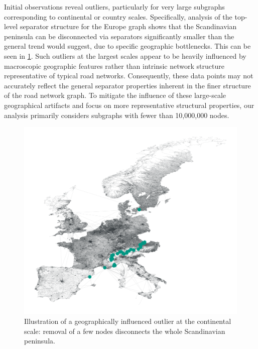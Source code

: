 Initial observations reveal outliers, particularly for very large subgraphs corresponding to continental or country scales.
Specifically, analysis of the top-level separator structure for the Europe graph shows that the Scandinavian peninsula can be disconnected via separators significantly smaller than the general trend would suggest, due to specific geographic bottlenecks.
This can be seen in \cref{fig:europe_top_separator}.
Such outliers at the largest scales appear to be heavily influenced by macroscopic geographic features rather than intrinsic network structure representative of typical road networks.
Consequently, these data points may not accurately reflect the general separator properties inherent in the finer structure of the road network graph.
To mitigate the influence of these large-scale geographical artifacts and focus on more representative structural properties, our analysis primarily considers subgraphs with fewer than 10,000,000 nodes.

\begin{figure}[tbhp]
	\centering
	\includegraphics[width=0.6\linewidth]{graphics/europe-top-level-sep.png}
	\caption{Illustration of a geographically influenced outlier at the continental scale: removal of a few nodes disconnects the whole Scandinavian peninsula.}
	\label{fig:europe_top_separator}
\end{figure}

